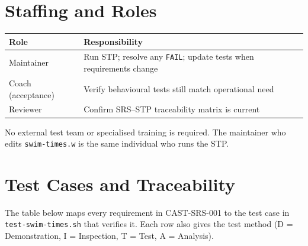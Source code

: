 \documentclass[12pt]{article}
\newcommand{\code}[1]{\texttt{#1}}
\begin{document}
\section{Staffing and Roles}

\begin{center}
\begin{tabular}{ll}
  \toprule
  \textbf{Role}        & \textbf{Responsibility}                                \\
  \midrule
  Maintainer           & Run STP; resolve any \code{FAIL}; update tests when
                         requirements change                                    \\
  Coach (acceptance)   & Verify behavioural tests still match operational need \\
  Reviewer             & Confirm SRS--STP traceability matrix is current       \\
  \bottomrule
\end{tabular}
\end{center}

No external test team or specialised training is required.  The
maintainer who edits \code{swim-times.w} is the same individual
who runs the STP.

\section{Test Cases and Traceability}

The table below maps every requirement in CAST-SRS-001 to the
test case in \code{test-swim-times.sh} that verifies it.  Each
row also gives the test method (D = Demonstration, I = Inspection,
T = Test, A = Analysis).
\end{document}

